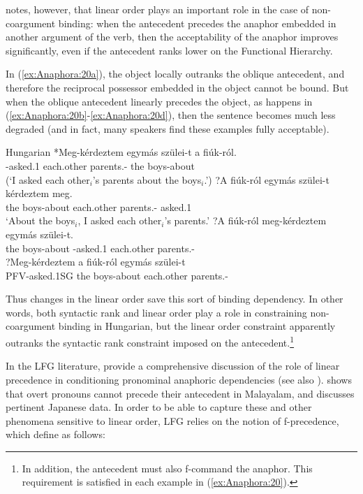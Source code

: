 \documentclass[output=paper,hidelinks]{langscibook}
\begin{document}
\noindent \citeauthor{Kiss2008-ls} notes, however, that linear order plays an important role in the case of non-coargument binding: when the antecedent precedes the anaphor embedded in another argument of the verb, then the acceptability of the anaphor improves significantly, even if the antecedent ranks lower on the Functional Hierarchy.

In (\ref{ex:Anaphora:20a}), the object locally outranks the oblique antecedent, and therefore the reciprocal possessor embedded in the object cannot be bound. But when the oblique antecedent linearly precedes the object, as happens in (\ref{ex:Anaphora:20b}-\ref{ex:Anaphora:20d}), then the sentence becomes much less degraded (and in fact, many speakers find these examples fully acceptable).

\ea\label{ex:Anaphora:20} Hungarian \citep[452]{Kiss2008-ls}
\ea\label{ex:Anaphora:20a}\gll
 *Meg-kérdeztem  egymás   szülei-t        a fiúk-ról.\\
 \PFV-asked.{1\SG}   each.other  parents.\POSS-{\ACC} the boys-about\\
 \glt(`I asked each other$_i$'s parents about the boys$_i$.')
\ex\label{ex:Anaphora:20b}\gll
 ?A fiúk-ról  egymás     szülei-t         kérdeztem meg.\\
 the boys-about each.other parents.\POSS-{\ACC} asked.{1\SG}  {\PFV}\\
 \glt`About the boys$_i$, I asked each other$_i$'s parents.'
\ex\label{ex:Anaphora:20c}\gll
    ?A fiúk-ról    meg-kérdeztem egymás     szülei-t. \\
 the boys-about  \PFV-asked.{1\SG}    each.other  parents.\POSS-{\ACC}\\
\ex\label{ex:Anaphora:20d}\gll
  ?Meg-kérdeztem a fiúk-ról      egymás    szülei-t\\     
 PFV-asked.1SG   the boys-about   each.other  parents.\POSS-{\ACC}\\
\z\z

\noindent Thus changes in the linear order save this sort of binding dependency. In other words, both syntactic rank and linear order play a role in constraining non-coargument binding in Hungarian, but the linear order constraint apparently outranks the syntactic rank constraint imposed on the antecedent.\footnote{In addition, the antecedent must also f-command the anaphor. This requirement is satisfied in each example in (\ref{ex:Anaphora:20}).}

In the LFG literature, \citet{BresnanEtAl2016} provide a comprehensive discussion of the role of linear precedence in conditioning pronominal anaphoric dependencies (see also ). \citet{mohanan1982} shows that overt pronouns cannot precede their antecedent in Malayalam, and \citet{kameyama85} discusses pertinent Japanese data. In order to be able to capture these and other phenomena sensitive to linear order, LFG relies on the notion of f-precedence, which \citet{kaplan-zaenen1989-fprec} define as follows:
\end{document}
